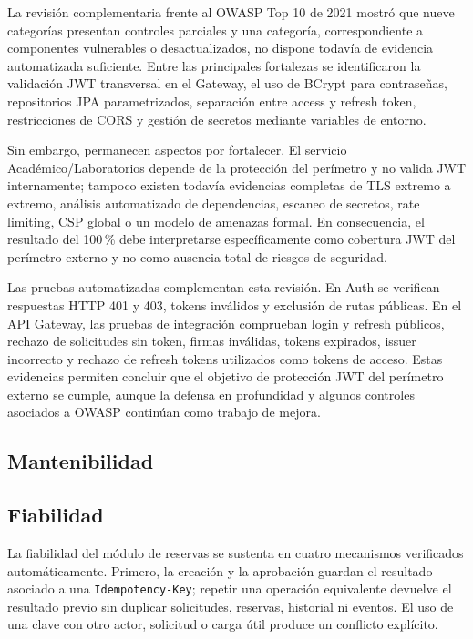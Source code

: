 La revisión complementaria frente al OWASP Top 10 de 2021 mostró que nueve
categorías presentan controles parciales y una categoría, correspondiente a
componentes vulnerables o desactualizados, no dispone todavía de evidencia
automatizada suficiente. Entre las principales fortalezas se identificaron
la validación JWT transversal en el Gateway, el uso de BCrypt para
contraseñas, repositorios JPA parametrizados, separación entre access y
refresh token, restricciones de CORS y gestión de secretos mediante variables
de entorno.

Sin embargo, permanecen aspectos por fortalecer. El servicio
Académico/Laboratorios depende de la protección del perímetro y no valida JWT
internamente; tampoco existen todavía evidencias completas de TLS extremo a
extremo, análisis automatizado de dependencias, escaneo de secretos, rate
limiting, CSP global o un modelo de amenazas formal. En consecuencia, el
resultado del 100\,\% debe interpretarse específicamente como cobertura JWT
del perímetro externo y no como ausencia total de riesgos de seguridad.

Las pruebas automatizadas complementan esta revisión. En Auth se verifican
respuestas HTTP 401 y 403, tokens inválidos y exclusión de rutas públicas. En
el API Gateway, las pruebas de integración comprueban login y refresh
públicos, rechazo de solicitudes sin token, firmas inválidas, tokens
expirados, issuer incorrecto y rechazo de refresh tokens utilizados como
tokens de acceso. Estas evidencias permiten concluir que el objetivo de
protección JWT del perímetro externo se cumple, aunque la defensa en
profundidad y algunos controles asociados a OWASP continúan como trabajo de
mejora.

\subsection{Mantenibilidad}

\subsection{Fiabilidad}

La fiabilidad del módulo de reservas se sustenta en cuatro mecanismos
verificados automáticamente. Primero, la creación y la aprobación guardan
el resultado asociado a una \texttt{Idempotency-Key}; repetir una operación
equivalente devuelve el resultado previo sin duplicar solicitudes,
reservas, historial ni eventos. El uso de una clave con otro actor,
solicitud o carga útil produce un conflicto explícito.


